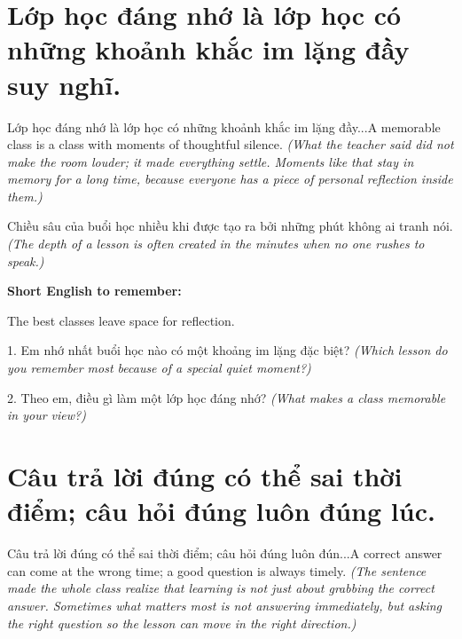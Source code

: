 \section{Lớp học đáng nhớ là lớp học có những khoảnh khắc im lặng đầy suy nghĩ.}
\begin{truyen}{Lớp học đáng nhớ là lớp học có những khoảnh khắc im lặng đầy...}{A memorable class is a class with moments of thoughtful silence.}
\textit{(What the teacher said did not make the room louder; it made everything settle. Moments like that stay in memory for a long time, because everyone has a piece of personal reflection inside them.)}
\end{truyen}

\begin{baihoc}
Chiều sâu của buổi học nhiều khi được tạo ra bởi những phút không ai tranh nói.
\textit{(The depth of a lesson is often created in the minutes when no one rushes to speak.)}
\end{baihoc}

\begin{ghinhoanh}
\textbf{Short English to remember:}

The best classes leave space for reflection.

\end{ghinhoanh}

\begin{tuhocnhanh}
1. Em nhớ nhất buổi học nào có một khoảng im lặng đặc biệt? \textit{(Which lesson do you remember most because of a special quiet moment?)}

2. Theo em, điều gì làm một lớp học đáng nhớ? \textit{(What makes a class memorable in your view?)}
\end{tuhocnhanh}
\ngancach


\section{Câu trả lời đúng có thể sai thời điểm; câu hỏi đúng luôn đúng lúc.}
\begin{truyen}{Câu trả lời đúng có thể sai thời điểm; câu hỏi đúng luôn đún...}{A correct answer can come at the wrong time; a good question is always timely.}
\textit{(The sentence made the whole class realize that learning is not just about grabbing the correct answer. Sometimes what matters most is not answering immediately, but asking the right question so the lesson can move in the right direction.)}
\end{truyen}

